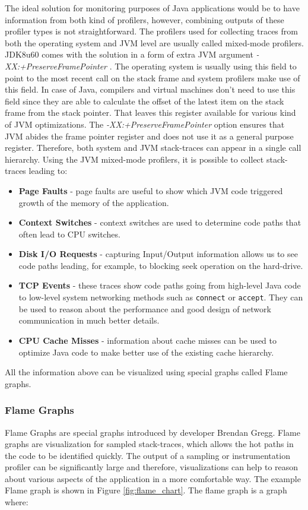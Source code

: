 The ideal solution for monitoring purposes of Java applications would be to have information from both kind of profilers, however, combining outputs of these profiler types is not straightforward. The profilers used for collecting traces from both the operating system and JVM level are usually called mixed-mode profilers. JDK8u60 comes with the solution in a form of extra JVM argument \textit{-XX:+PreserveFramePointer} \cite{MixedModeProfilers}. The operating system is usually using this field to point to the most recent call on the stack frame and system profilers make use of this field. In case of Java, compilers and virtual machines don't need to use this field since they are able to calculate the offset of the latest item on the stack frame from the stack pointer. That leaves this register available for various kind of JVM optimizations. The \textit{-XX:+PreserveFramePointer} option ensures that JVM abides the frame pointer register and does not use it as a general purpose register. Therefore, both system and JVM stack-traces can appear in a single call hierarchy. Using the JVM mixed-mode profilers, it is possible to collect stack-traces leading to:
\begin{itemize}
	\item \textbf{Page Faults} - page faults are useful to show which JVM code triggered growth of the memory of the application.
	\item \textbf{Context Switches} - context switches are used to determine code paths that often lead to CPU switches.
	\item\textbf{Disk I/O Requests} - capturing Input/Output information allows us to see code paths leading, for example, to blocking seek operation on the hard-drive.
	\item \textbf{TCP Events} - these traces show code paths going from high-level Java code to low-level system networking methods such as \texttt{connect} or \texttt{accept}. They can be used to reason about the performance and good design of network communication in much better details.
	\item \textbf{CPU Cache Misses} - information about cache misses can be used to optimize Java code to make better use of the existing cache hierarchy.
\end{itemize}

All the information above can be visualized using special graphs called Flame graphs.
\subsubsection{Flame Graphs}
Flame Graphs are special graphs introduced by developer Brendan Gregg. Flame graphs are visualization for sampled stack-traces, which allows the hot paths in the code to be identified quickly. The output of a sampling or instrumentation profiler can be significantly large and therefore, visualizations can help to reason about various aspects of the application in a more comfortable way. The example Flame graph is shown in Figure \ref{fig:flame_chart}. The flame graph is a graph where:

